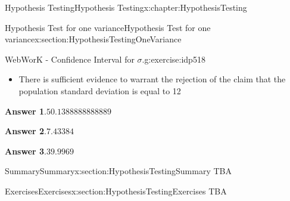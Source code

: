 \documentclass[oneside,10pt,]{book}
\newcommand{\blocktitlefont}{\relax}
\numberwithin{equation}{section}
\begin{document}
\begin{chapterptx}{Hypothesis Testing}{}{Hypothesis Testing}{}{}{x:chapter:HypothesisTesting}
\begin{sectionptx}{Hypothesis Test for one variance}{}{Hypothesis Test for one variance}{}{}{x:section:HypothesisTestingOneVariance}
\begin{inlineexercise}{WebWorK - Confidence Interval for \(\sigma\).}{g:exercise:idp518}
\begin{itemize}[label=$\odot$,leftmargin=3em,]
\item{}There is sufficient evidence to warrant the rejection of the claim that the population standard deviation is equal to 12%

\end{itemize}
%
\par\smallskip%
\noindent\textbf{\blocktitlefont Answer 1}.\hypertarget{g:answer:idp519}{}\quad{}\(50.1388888888889\)%
\par\smallskip%
\noindent\textbf{\blocktitlefont Answer 2}.\hypertarget{g:answer:idp520}{}\quad{}\(7.43384\)%
\par\smallskip%
\noindent\textbf{\blocktitlefont Answer 3}.\hypertarget{g:answer:idp521}{}\quad{}\(39.9969\)%
\end{inlineexercise}%
\end{sectionptx}
%
%
\typeout{************************************************}
\typeout{************************************************}
%
\begin{sectionptx}{Summary}{}{Summary}{}{}{x:section:HypothesisTestingSummary}
TBA%
\end{sectionptx}
%
%
\typeout{************************************************}
\typeout{************************************************}
%
\begin{sectionptx}{Exercises}{}{Exercises}{}{}{x:section:HypothesisTestingExercises}
TBA%
\end{sectionptx}
\end{chapterptx}
%
%
\typeout{************************************************}
\typeout{************************************************}
%
\end{document}
